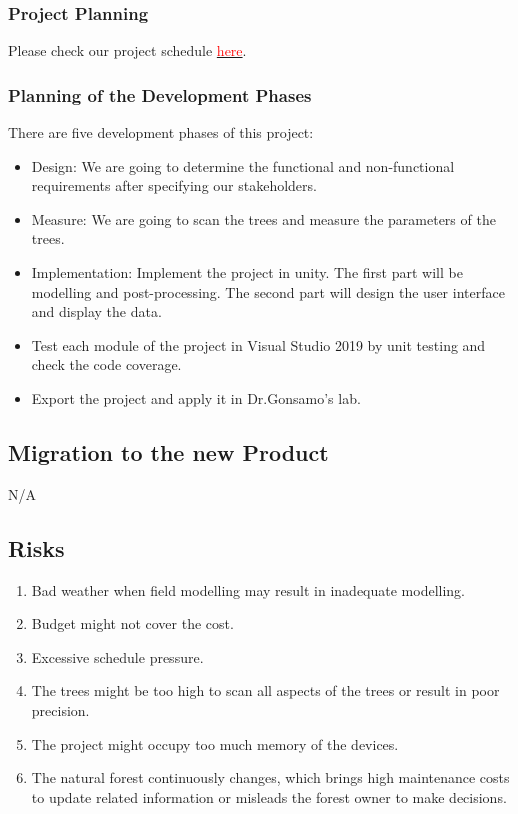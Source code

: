 \documentclass{article}
\begin{document}
\subsubsection{Project Planning}
Please check our project schedule \href{https://github.com/wuj187/DigitalTwinCAS/tree/main/docs/DevelopmentPlan/Project_Schedule}{\textcolor{red}{here}}.
\subsubsection{Planning of the Development Phases}
There are five development phases of this project:
\begin{itemize}
    \item Design: We are going to determine the functional and non-functional requirements after specifying our stakeholders.
    \item Measure: We are going to scan the trees and measure the parameters of the trees.
    \item Implementation: Implement the project in unity. The first part will be modelling and post-processing. The second part will design the user interface and display the data.
    \item Test each module of the project in Visual Studio 2019 by unit testing and check the code coverage.
    \item Export the project and apply it in Dr.Gonsamo's lab.
\end{itemize}
\subsection{Migration to the new Product}
N/A
\subsection{Risks}
\begin{enumerate}
    \item Bad weather when field modelling may result in inadequate modelling.
    \item Budget might not cover the cost.
    \item Excessive schedule pressure.
    \item The trees might be too high to scan all aspects of the trees or result in poor precision.
    \item The project might occupy too much memory of the devices.
    \item The natural forest continuously changes, which brings high maintenance costs to update related information or misleads the forest owner to make decisions. 
\end{enumerate}
\end{document}
